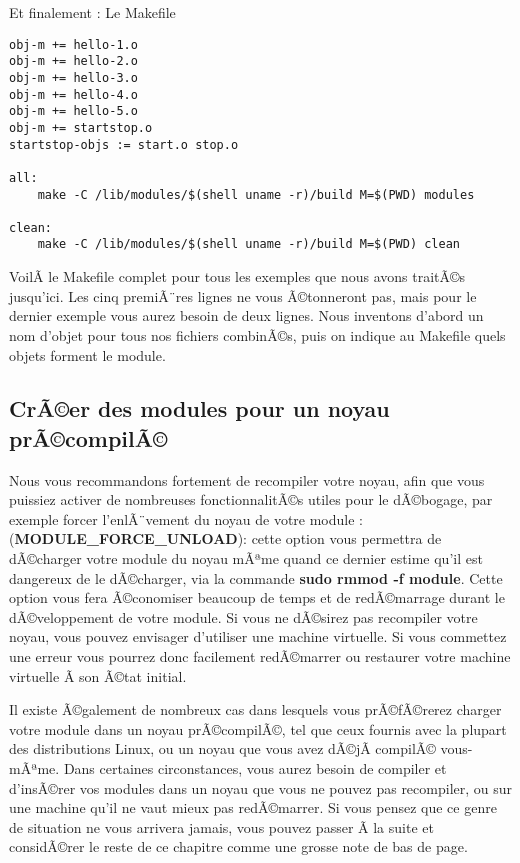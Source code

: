\documentclass[11pt]{article}
\begin{document}
Et finalement : Le Makefile

\begin{verbatim}
obj-m += hello-1.o
obj-m += hello-2.o
obj-m += hello-3.o
obj-m += hello-4.o
obj-m += hello-5.o
obj-m += startstop.o
startstop-objs := start.o stop.o

all:
    make -C /lib/modules/$(shell uname -r)/build M=$(PWD) modules

clean:
    make -C /lib/modules/$(shell uname -r)/build M=$(PWD) clean
\end{verbatim}

VoilÃ  le Makefile complet pour tous les exemples que nous avons traitÃ©s jusqu'ici. Les cinq premiÃ¨res lignes ne vous Ã©tonneront pas, mais pour le dernier exemple vous aurez besoin de deux lignes. Nous inventons d'abord un nom d'objet pour tous nos fichiers combinÃ©s, puis on indique au Makefile quels objets forment le module.

\subsection*{CrÃ©er des modules pour un noyau prÃ©compilÃ©}
\label{sec-4-7}

Nous vous recommandons fortement de recompiler votre noyau, afin que vous puissiez activer de nombreuses fonctionnalitÃ©s utiles pour le dÃ©bogage, par exemple forcer l'enlÃ¨vement du noyau de votre module : (\textbf{MODULE\_FORCE\_UNLOAD}): cette option vous permettra de dÃ©charger votre module du noyau mÃªme quand ce dernier estime qu'il est dangereux de le dÃ©charger, via la commande \textbf{sudo rmmod -f module}. Cette option vous fera Ã©conomiser beaucoup de temps et de redÃ©marrage durant le dÃ©veloppement de votre module. Si vous ne dÃ©sirez pas recompiler votre noyau, vous pouvez envisager d'utiliser une machine virtuelle. Si vous commettez une erreur vous pourrez donc facilement redÃ©marrer ou restaurer votre machine virtuelle Ã  son Ã©tat initial.

Il existe Ã©galement de nombreux cas dans lesquels vous prÃ©fÃ©rerez charger votre module dans un noyau prÃ©compilÃ©, tel que ceux fournis avec la plupart des distributions Linux, ou un noyau que vous avez dÃ©jÃ  compilÃ© vous-mÃªme. Dans certaines circonstances, vous aurez besoin de compiler et d'insÃ©rer vos modules dans un noyau que vous ne pouvez pas recompiler, ou sur une machine qu'il ne vaut mieux pas redÃ©marrer. Si vous pensez que ce genre de situation ne vous arrivera jamais, vous pouvez passer Ã  la suite et considÃ©rer le reste de ce chapitre comme une grosse note de bas de page.
\end{document}
